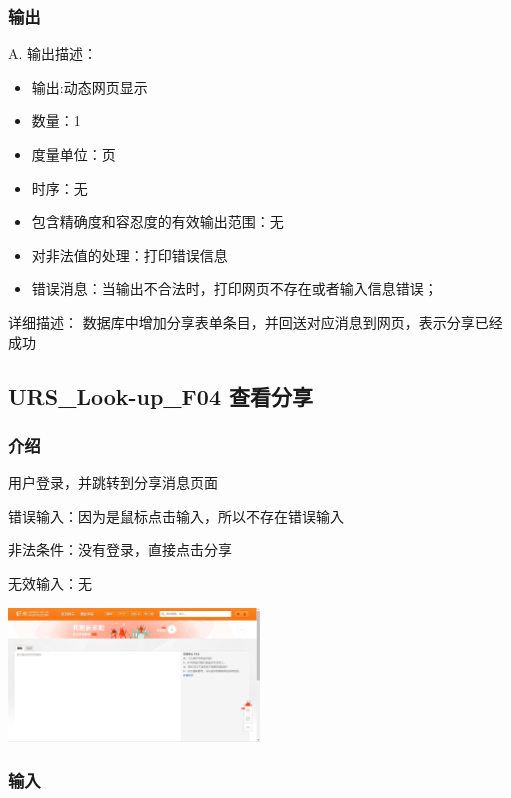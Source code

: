    \subsubsection{输出}
   
   A. 输出描述：
   \begin{itemize}
	\item	输出:动态网页显示
	\item	数量：1
	\item	度量单位：页
	\item	时序：无
	\item	包含精确度和容忍度的有效输出范围：无
	\item	对非法值的处理：打印错误信息
	\item	错误消息：当输出不合法时，打印网页不存在或者输入信息错误；
   \end{itemize}
   详细描述：
   数据库中增加分享表单条目，并回送对应消息到网页，表示分享已经成功
 




   \subsection{URS\_Look-up\_F04 查看分享}

   \subsubsection{介绍}
   
   用户登录，并跳转到分享消息页面
   
   错误输入：因为是鼠标点击输入，所以不存在错误输入
   
   非法条件：没有登录，直接点击分享
   
   无效输入：无
   \begin{center} 
	\includegraphics[width=0.5\textwidth]{./figures/capture7.png} 

	\end{center}
   \subsubsection{输入}
   
